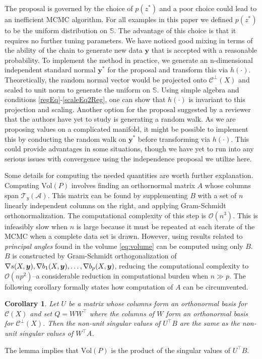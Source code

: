 \documentclass[ba]{imsart}
\newcommand{\by}{\mbox{\boldmath $y$}}
\newcommand{\mb}{\mathbf}
\newcommand{\mc}{\mathcal}
\newtheorem{corollary}[theorem]{\bf Corollary}
\begin{document}
The proposal is governed by the choice of $p(z^{*})$ and a poor choice could lead to an inefficient MCMC algorithm. For all examples in this paper we defined $p(z^{*})$ to be the uniform distribution on $\mathbb{S}$. The advantage of this choice is that it requires no further tuning parameters.  We have noticed good mixing in terms of the ability of the chain to generate new data $\mb y$ that is accepted with a reasonable probability. To implement the method in practice, we generate an n-dimensional independent standard normal $\mb y^{*}$ for the proposal and transform this via $h(\cdot)$. Theoretically, the random normal vector would be projected onto $\mc{C}^{\perp}(X)$ and scaled to unit norm to generate the uniform on $\mathbb{S}$. Using simple algebra and conditions \ref{regEq}-\ref{scaleEq2Reg}, one can show that $h(\cdot)$ is invariant to this projection and scaling. Another option for the proposal suggested by a reviewer that the authors have yet to study is generating a random walk. As we are proposing values on a complicated manifold, it might be possible to implement this by conducting the random walk on $\mb y^{*}$ before transforming via $h(\cdot)$. This could provide advantages in some situations, though we have yet to run into any serious issues with convergence using the independence proposal we utilize here.

Some details for computing the needed quantities are worth further explanation. Computing $\text{Vol} (P)$ involves finding an orthornormal matrix $A$ whose columns span $\mc T_{y}(\mc A)$. This matrix can be found by supplementing $B$ with a set of $n$ linearly independent columns on the right, and applying Gram-Schmidt orthonormalization.  The computational complexity of this step is $\mc O(n^3)$.  This is infeasibly slow when $n$ is large because it must be repeated at each iterate of the MCMC when a complete data set is drawn.  However, using results related to \textit{principal angles} found in \cite{miao1992} the volume \eqref{eq:volume} can be computed using only $B$. $B$ is constructed by Gram-Schmidt orthogonalization of $\nabla s(X,\by), \nabla b_1(X,\by),\dots, \nabla b_p(X,\by)$, reducing the computational complexity to $\mc O(np^2)$--a 
considerable reduction in computational burden when $n \gg p$. 
The following corollary formally states how computation of $A$ can be circumvented. 
\begin{corollary}
\label{theorem:sings}
Let $U$ be a matrix whose columns form an orthonormal basis for $\mc C (X)$ and set $Q=WW^{\top}$ where the columns of $W$ form an orthonormal basis for $\mc{C}^\perp(X)$. Then the non-unit singular values of $U^\top B$ are the same as the non-unit singular values of $W^\top A$.
\end{corollary} 
\noindent The lemma implies that $\text{Vol} (P)$ is the product of the singular values of $U^\top B$. 
\end{document}
